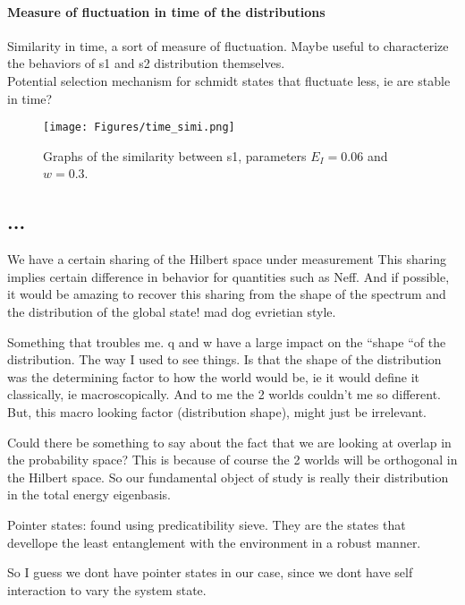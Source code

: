 \documentclass{article}
\begin{document}
\paragraph{Measure of fluctuation in time of the distributions}
Similarity in time, a sort of measure of fluctuation. Maybe useful to characterize the behaviors of s1 and s2 distribution themselves.\\

Potential selection mechanism for schmidt states that fluctuate less, ie are stable in time?


\begin{figure}
    \centering
    \texttt{[image: Figures/time\_simi.png]}
    \caption{Graphs of the similarity between s1, parameters $E_I=0.06$ and $w=0.3$.}
    \label{fig:time_simi}
\end{figure}

\subsection{...}

We have a certain sharing of the Hilbert space under measurement
This sharing implies certain difference in behavior for quantities such as Neff. And if possible, it would be amazing to recover this sharing from the shape of the spectrum and the distribution of the global state!  mad dog evrietian style.

Something that troubles me. q and w have a large impact on the  “shape “of the distribution. The way I used to see things. Is that the shape of the distribution was the determining factor to how the world would be, ie it would define it classically, ie macroscopically. And to me the 2 worlds couldn’t me so different. But, this macro looking factor (distribution shape), might just be irrelevant.  

Could there be something to say about the fact that we are looking at overlap in the probability space? This is because of course the 2 worlds will be orthogonal in the Hilbert space. 
So our fundamental object of study is really their distribution in the total energy eigenbasis.



Pointer states: found using predicatibility sieve. They are the states that devellope the least entanglement with the environment in a robust manner.

So I guess we dont have pointer states in our case, since we dont have self interaction to vary the system state.
\end{document}
